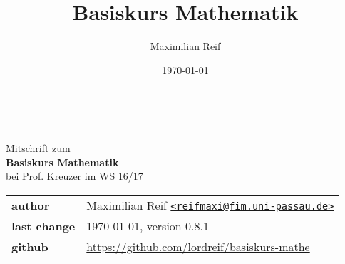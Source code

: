 \documentclass[11pt,a4paper,ngerman]{article}
\date{\today}
\author{Maximilian Reif}
\title{Basiskurs Mathematik}
\begin{document}
\begin{titlepage}
    \ \newline\newline\newline\newline\newline
	\begin{center}
		\huge Mitschrift zum \\
		\Huge \textbf{Basiskurs Mathematik} \\
		\huge bei Prof. Kreuzer im WS 16/17 \\
		\normalsize

		\vspace{1cm}
		\begin{tabular}[b]{l|l}
			\textbf{author} & Maximilian Reif \texttt{\href{mailto:reifmaxi@fim.uni-passau.de}
			{<reifmaxi@fim.uni-passau.de>}} \\
			\textbf{last change} & \today, version 0.8.1 \\
			\textbf{github} & \url{https://github.com/lordreif/basiskurs-mathe}
		\end{tabular}

		\vspace{1cm}
		
	\end{center}
   
	
\end{titlepage}

\setcounter{page}{2}

\newpage
\tableofcontents \thispagestyle{empty}
\newpage








%
%
%
\setcounter{section}{10}


\end{document}
